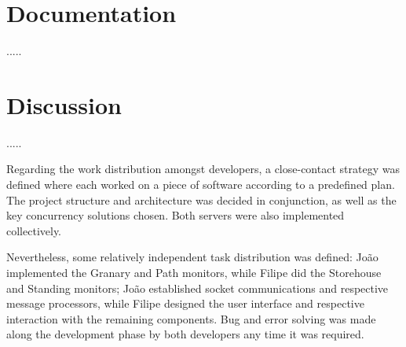 \documentclass[12pt]{article}
\begin{document}


\newpage
\section{Documentation} %

.....

\newpage
\section{Discussion} %

.....

Regarding the work distribution amongst developers, a close-contact strategy was defined where each worked on a piece of software according to a predefined plan. 
The project structure and architecture was decided in conjunction, as well as the key concurrency solutions chosen.
Both servers were also implemented collectively.

Nevertheless, some relatively independent task distribution was defined: João implemented the Granary and Path monitors, while Filipe did the Storehouse and 
Standing monitors; João established socket communications and respective message processors, while Filipe designed the user interface and respective interaction
with the remaining components.
Bug and error solving was made along the development phase by both developers any time it was required.
\end{document}

